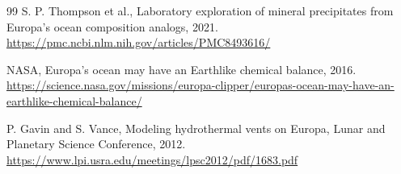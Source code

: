 \documentclass[11pt]{article}
\begin{document}
\begin{thebibliography}{99}
S. P. Thompson et al.,
Laboratory exploration of mineral precipitates from Europa's ocean composition analogs,
2021.
\url{https://pmc.ncbi.nlm.nih.gov/articles/PMC8493616/}

NASA,
Europa's ocean may have an Earthlike chemical balance, 2016.
\url{https://science.nasa.gov/missions/europa-clipper/europas-ocean-may-have-an-earthlike-chemical-balance/}

P. Gavin and S. Vance,
Modeling hydrothermal vents on Europa,
Lunar and Planetary Science Conference, 2012.
\url{https://www.lpi.usra.edu/meetings/lpsc2012/pdf/1683.pdf}

\end{thebibliography}
\end{document}
